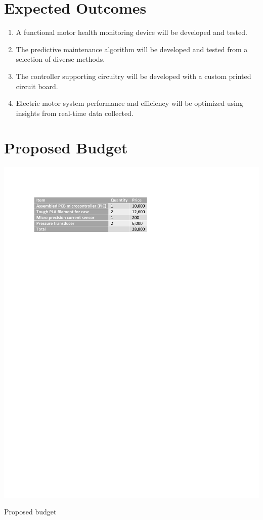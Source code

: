 \section{Expected Outcomes}
\begin{enumerate}
\item A functional motor health monitoring device will be developed and tested.
\item The predictive maintenance algorithm will be developed and tested from a selection of diverse methods.
\item The controller supporting circuitry will be developed with a custom printed circuit board.
\item Electric motor system performance and efficiency will be optimized using insights from real-time data collected.
\end{enumerate}
\newpage
\section{Proposed Budget}
\begin{table}[!h]
\includegraphics{Figures/budget}
\caption{Proposed budget}
\end{table}
